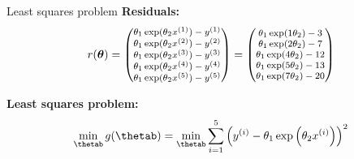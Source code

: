\documentclass[11pt,compress,t,notes=noshow, xcolor=table]{beamer}
\begin{document}
\begin{vbframe}{Least squares problem}
\textbf{Residuals:}
\begin{equation*}
    \footnotesize
    r(\bm{\theta}) = \begin{pmatrix} 
        \theta_1 \exp(\theta_2 x^{(1)}) - y^{(1)} \\
        \theta_1 \exp(\theta_2 x^{(2)}) - y^{(2)} \\
        \theta_1 \exp(\theta_2 x^{(3)}) - y^{(3)} \\
        \theta_1 \exp(\theta_2 x^{(4)}) - y^{(4)} \\
        \theta_1 \exp(\theta_2 x^{(5)}) - y^{(5)}
     \end{pmatrix} = \begin{pmatrix} 
        \theta_1 \exp(1 \theta_2) - 3 \\
        \theta_1 \exp(2 \theta_2) - 7 \\
        \theta_1 \exp(4 \theta_2) - 12 \\
        \theta_1 \exp(5 \theta_2) - 13 \\
        \theta_1 \exp(7 \theta_2) - 20
     \end{pmatrix}
\end{equation*}

\textbf{Least squares problem:}
\begin{equation*}
    \min_{\thetab} g(\thetab) = \min_{\thetab} \sum_{i=1}^{5} \left(\yi - \theta_1 \exp\left(\theta_2 x^{(i)}\right)\right)^2
\end{equation*}

\end{vbframe}
\end{document}
